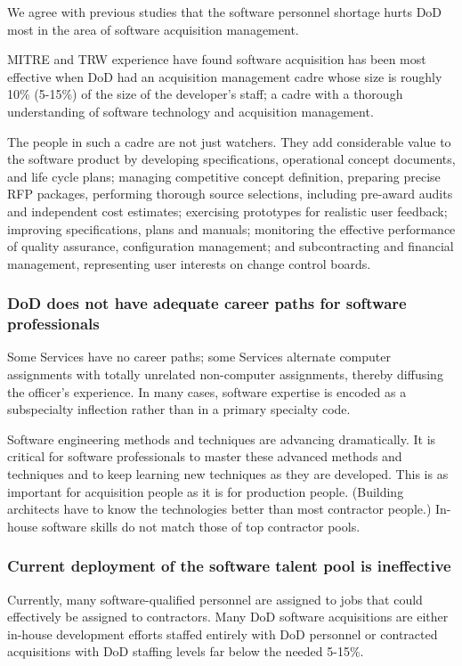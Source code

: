 \documentclass[11pt,final]{article}
\begin{document}
We agree with previous studies that the software personnel shortage hurts DoD
most in the area of software acquisition management.

MITRE and TRW experience have found software acquisition has been most
effective when DoD had an acquisition management cadre whose size is roughly
10\% (5-15\%) of the size of the developer’s staff; a cadre with a thorough
understanding of software technology and acquisition management.

The people in such a cadre are not just watchers. They add considerable value
to the software product by developing specifications, operational concept
documents, and life cycle plans; managing competitive concept definition,
preparing precise RFP packages, performing thorough source selections,
including pre-award audits and independent cost estimates; exercising
prototypes for realistic user feedback; improving specifications, plans and
manuals; monitoring the effective performance of quality assurance,
configuration management; and subcontracting and financial management,
representing user interests on change control boards.

\subsubsection*{DoD does not have adequate career paths for software professionals}

Some Services have no career paths; some Services alternate computer
assignments with totally unrelated non-computer assignments, thereby diffusing
the officer’s experience. In many cases, software expertise is encoded as a
subspecialty inflection rather than in a primary specialty code.

Software engineering methods and techniques are advancing dramatically. It is
critical for software professionals to master these advanced methods and
techniques and to keep learning new techniques as they are developed. This is
as important for acquisition people as it is for production people. (Building
architects have to know the technologies better than most contractor people.)
In-house software skills do not match those of top contractor pools.

\subsubsection*{Current deployment of the software talent pool is ineffective}

Currently, many software-qualified personnel are assigned to jobs that could
effectively be assigned to contractors. Many DoD software acquisitions are
either in-house development efforts staffed entirely with DoD personnel or
contracted acquisitions with DoD staffing levels far below the needed 5-15\%.
\end{document}
